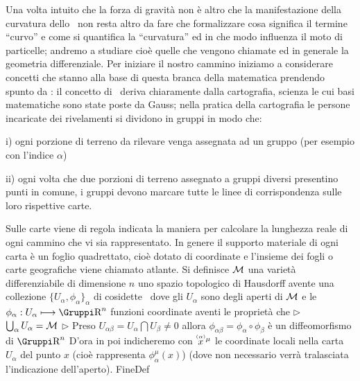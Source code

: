 
Una volta intuito che la forza di gravit\`a non \`e altro che la manifestazione della curvatura dello \ST\ non resta altro da fare che formalizzare cosa significa il termine ``curvo'' e come si quantifica la ``curvatura'' ed in che modo influenza il moto di particelle; andremo a studiare cio\`e quelle che vengono chiamate  ed in generale la geometria differenziale.
%
%
%
\eject
{}
Per iniziare il nostro cammino iniziamo a considerare concetti che stanno alla base di questa branca della matematica prendendo spunto da : il concetto di \ deriva chiaramente dalla cartografia, scienza le cui basi matematiche sono state poste da Gauss; nella pratica della cartografia le persone incaricate dei rivelamenti si dividono in gruppi in modo che:
\item{i)} ogni porzione di terreno da rilevare venga assegnata ad un gruppo (per esempio con l'indice $\alpha$)
\item{ii)} ogni volta che due porzioni di terreno assegnato a gruppi diversi presentino punti in comune, i gruppi devono marcare tutte le linee di corrispondenza sulle loro rispettive carte.\par
\noindent Sulle carte viene di regola indicata la maniera per calcolare la lunghezza reale di ogni cammino che vi sia rappresentato. In genere il supporto materiale di ogni carta \`e un foglio quadrettato, cio\`e dotato di coordinate e l'insieme dei fogli o carte geografiche viene chiamato atlante.
 Si definisce  ${\cal M}$ una variet\`a differenziabile di dimensione $n$ uno spazio topologico di Hausdorff avente una col\-le\-zione $\{U_\alpha,\phi_\alpha\}_\alpha$ di cosidette \ dove gli $U_\alpha$ sono degli aperti di ${\cal M}$ e le  $\phi_\alpha:U_\alpha\longmapsto \RN{n} $ funzioni coordinate aventi le propriet\`a che\smallskip
$\triangleright$ $\bigcup_\alpha U_\alpha={\cal M}$\smallskip
$\triangleright$ Preso $U_{\alpha\beta}=U_\alpha\bigcap U_\beta\neq 0$ allora $\phi_{\alpha\beta}=\phi_{\alpha}\circ\phi_{\beta}$ \`e un diffeomorfismo di $\RN n$
D'ora in poi indicheremo con $\chart{x}{^\mu}{\alpha}$ le coordinate locali nella carta $U_\alpha$ del punto $x$ (cio\`e rappresenta $\phi^\mu_\alpha(x)$) (dove non necessario verr\`a tralasciata l'indicazione dell'aperto).
FineDef
